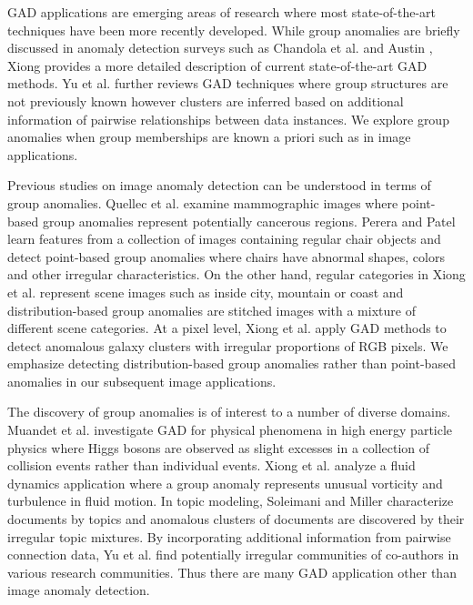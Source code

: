 
GAD applications are emerging areas of research where most state-of-the-art techniques have been more recently developed.  While group anomalies are briefly discussed in anomaly detection surveys such as Chandola et al. \cite{Chandola} and Austin \cite{Hodge},  Xiong \cite{Collective} provides a more detailed description of current state-of-the-art GAD methods.  Yu et al. \cite{SurveySocialMedia} further reviews GAD techniques where group structures are not previously known however  clusters are inferred based on additional information of pairwise relationships between data instances. 
We explore  group anomalies when group memberships are known a priori such as in image applications. 

Previous studies on image anomaly detection %
can be understood in terms of group anomalies. 
Quellec et al.  \cite{mammo} examine mammographic images  where point-based group anomalies represent potentially cancerous regions. Perera and Patel \cite{chairs} learn features from a collection of images containing regular chair objects and detect point-based group anomalies where chairs have abnormal shapes, colors and other irregular characteristics. On the other hand, regular categories in Xiong et al. \cite{FGM}  represent scene images such as inside city, mountain or coast  and distribution-based group anomalies are stitched images with a mixture of different scene categories. At a pixel level,   Xiong et al. \cite{MGM} apply GAD methods to detect anomalous galaxy clusters with irregular proportions of RGB pixels. We emphasize detecting distribution-based group anomalies rather than point-based anomalies in our subsequent  image applications.

The discovery of group anomalies is of interest to a number of diverse domains.  %
  Muandet et al.	\cite{OCSMM} investigate GAD for physical phenomena in high energy particle physics where Higgs bosons are observed as slight excesses in a collection of collision events rather than individual  events. Xiong et al. \cite{FGM} analyze a fluid dynamics application where a group anomaly represents unusual vorticity and turbulence in  fluid motion.   In topic modeling,  Soleimani and Miller \cite{ATD} characterize documents by topics and anomalous clusters of documents are discovered by their irregular  topic mixtures.  By incorporating additional information from pairwise connection data, Yu et al. \cite{GLAD} find potentially irregular communities of co-authors in various research communities.
Thus there are many GAD application other than image anomaly detection.

